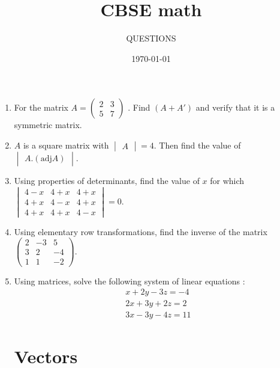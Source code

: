 \documentclass[10pt,-letter paper]{article}
\title{CBSE math}
\author{QUESTIONS}
\date{\today}
\providecommand{\brak}[1]{\ensuremath{\left(#1\right)}}
\newcommand{\myvec}[1]{\ensuremath{\begin{pmatrix}#1\end{pmatrix}}}
\newcommand{\mydet}[1]{\ensuremath{\begin{vmatrix}#1\end{vmatrix}}}
\begin{document}
\maketitle

\begin{enumerate}
\section{Matrices}

\item For the matrix $A = \myvec{2 & 3  \\ 5 & 7} $ . Find $\brak{A + A'}$ and verify that it is a symmetric matrix.
\item $ A $ is a square matrix with $\mydet{A} = 4 $. Then find the value of  $\mydet{ A .\brak{\text{adj} A}}$.
\item Using properties of determinants, find the value of $x$ for which $\mydet{4-x & 4+x & 4+x \\ 4+x & 4-x & 4+x \\ 4+x & 4+x & 4-x}=0$.
\item Using elementary row transformations, find the inverse of the matrix $\myvec{2 & -3 &5 \\ 3 & 2 & -4 \\ 1 & 1 & -2}$.
\item Using matrices, solve the following system of linear equations :
	\begin{align*}
		x+2y-3z=-4\\
		2x+3y+2z=2\\
		3x-3y-4z=11
	\end{align*}
 
\section{Vectors}


\end{enumerate}
\end{document}
